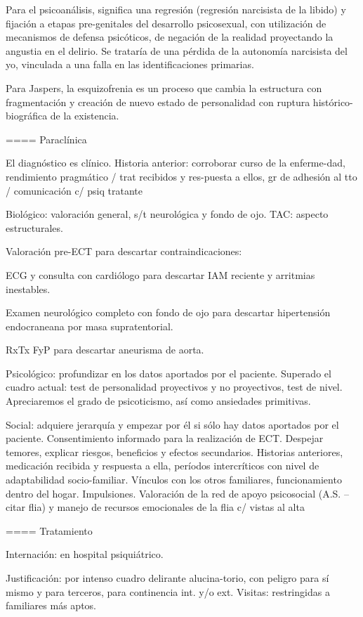 Para el psicoanálisis, significa una regresión (regresión narcisista de la libido) y fijación a etapas pre-genitales del desarrollo psicosexual, con utilización de mecanismos de defensa psicóticos, de negación de la realidad proyectando la angustia en el delirio. Se trataría de una pérdida de la autonomía narcisista del yo, vinculada a una falla en las identificaciones primarias.

Para Jaspers, la esquizofrenia es un proceso que cambia la estructura con fragmentación y creación de nuevo estado de personalidad con ruptura histórico-biográfica de la existencia.

==== Paraclínica

El diagnóstico es clínico. Historia anterior: corroborar curso de la enferme-dad, rendimiento pragmático / trat recibidos y res-puesta a ellos, gr de adhesión al tto / comunicación c/ psiq tratante

Biológico: valoración general, s/t neurológica y fondo de ojo. TAC: aspecto estructurales.

Valoración pre-ECT para descartar contraindicaciones:

ECG y consulta con cardiólogo para descartar IAM reciente y arritmias inestables.

Examen neurológico completo con fondo de ojo para descartar hipertensión endocraneana por masa supratentorial.

RxTx FyP para descartar aneurisma de aorta.

Psicológico: profundizar en los datos aportados por el paciente. Superado el cuadro actual: test de personalidad proyectivos y no proyectivos, test de nivel. Apreciaremos el grado de psicoticismo, así como ansiedades primitivas.

Social: adquiere jerarquía y empezar por él si sólo hay datos aportados por el paciente. Consentimiento informado para la realización de ECT. Despejar temores, explicar riesgos, beneficios y efectos secundarios. Historias anteriores, medicación recibida y respuesta a ella, períodos intercríticos con nivel de adaptabilidad socio-familiar. Vínculos con los otros familiares, funcionamiento dentro del hogar. Impulsiones. Valoración de la red de apoyo psicosocial (A.S. – citar flia) y manejo de recursos emocionales de la flia c/ vistas al alta

==== Tratamiento

Internación: en hospital psiquiátrico.

Justificación: por intenso cuadro delirante alucina-torio, con peligro para sí mismo y para terceros, para continencia int. y/o ext. Visitas: restringidas a familiares más aptos.

